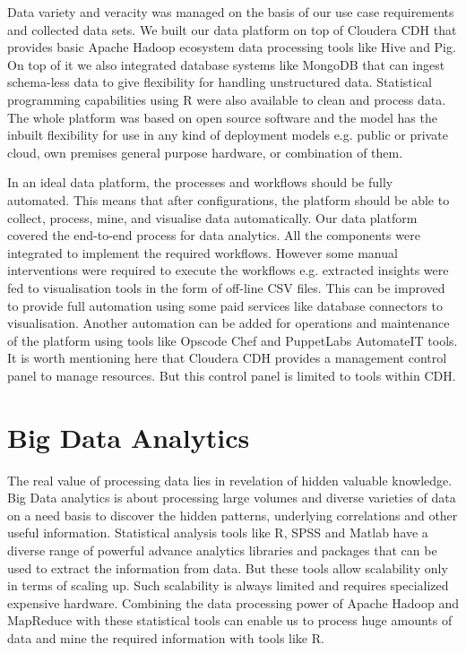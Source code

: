 Data variety and veracity was managed on the basis of our use case requirements and collected data sets. We built our data platform on top of Cloudera CDH that provides basic Apache Hadoop ecosystem data processing tools like Hive and Pig. On top of it we also integrated database systems like MongoDB that can ingest schema-less data to give flexibility for handling unstructured data. Statistical programming capabilities using R were also available to clean and process data. The whole platform was based on open source software and the model has the inbuilt flexibility for use in any kind of deployment models e.g. public or private cloud, own premises general purpose hardware, or combination of them. 

In an ideal data platform, the processes and workflows should be fully automated. This means that after configurations, the platform should be able to collect, process, mine, and visualise data automatically. Our data platform covered the end-to-end process for data analytics. All the components were integrated to implement the required workflows. However some manual interventions were required to execute the workflows e.g. extracted insights were fed to visualisation tools in the form of off-line CSV files. This can be improved to provide full automation using some paid services like database connectors to visualisation. Another automation can be added for operations and maintenance of the platform using tools like Opscode Chef and PuppetLabs AutomateIT tools. It is worth mentioning here that Cloudera CDH provides a management control panel to manage resources. But this control panel is limited to tools within CDH. 
\section{Big Data Analytics}
The real value of processing data lies in revelation of hidden valuable knowledge. Big Data analytics is about processing large volumes and diverse varieties of data on a need basis to discover the hidden patterns, underlying correlations and other useful information. Statistical analysis tools like R, SPSS and Matlab have a diverse range of powerful advance analytics libraries and packages that can be used to extract the information from data. But these tools allow scalability only in terms of scaling up. Such scalability is always limited and requires specialized expensive hardware. Combining the data processing power of Apache Hadoop and MapReduce with these statistical tools can enable us to process huge amounts of data and mine the required information with tools like R.

